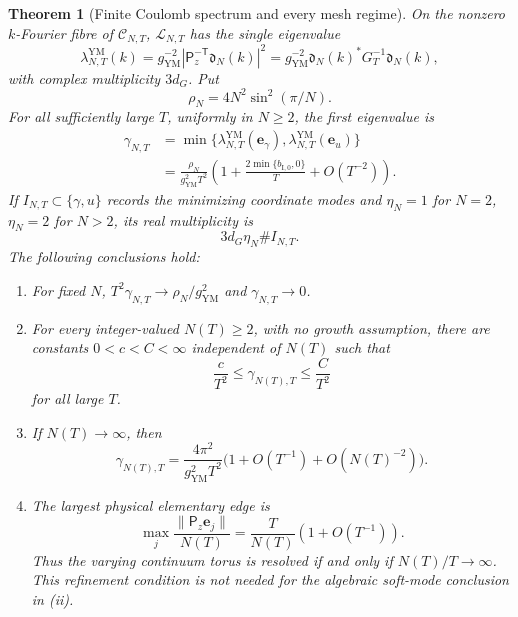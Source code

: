 \documentclass[11pt]{article}
\numberwithin{equation}{section}
\newtheorem{theorem}{Theorem}[section]
\theoremstyle{definition}
\theoremstyle{remark}
\begin{document}
\begin{theorem}[Finite Coulomb spectrum and every mesh regime]
\label{thm:finite-YM-gap}
On the nonzero $k$-Fourier fibre of $\mathscr C_{N,T}$,
$\mathcal L_{N,T}$ has the single eigenvalue
\begin{equation}\label{eq:finite-YM-mode}
 \lambda_{N,T}^{\mathrm{YM}}(k)
 =g_{\mathrm{YM}}^{-2}
 |\mathsf P_z^{-\mathsf T}\mathfrak d_N(k)|^2
 =g_{\mathrm{YM}}^{-2}\mathfrak d_N(k)^*G_T^{-1}
 \mathfrak d_N(k),
\end{equation}
with complex multiplicity $3d_G$.  Put
\begin{equation}\label{eq:finite-rho}
 \rho_N=4N^2\sin^2(\pi/N).
\end{equation}
For all sufficiently large $T$, uniformly in $N\ge2$, the first eigenvalue is
\begin{align}
 \gamma_{N,T}
 &=\min\{\lambda_{N,T}^{\mathrm{YM}}(\mathbf e_\gamma),
          \lambda_{N,T}^{\mathrm{YM}}(\mathbf e_u)\}
 \label{eq:finite-gap-exact}\\
 &=\frac{\rho_N}{g_{\mathrm{YM}}^2T^2}
 \left(1+\frac{2\min\{b_{\mathrm I,0},0\}}T+O(T^{-2})\right).
 \label{eq:finite-gap-expansion}
\end{align}
If $I_{N,T}\subset\{\gamma,u\}$ records the minimizing coordinate modes
and $\eta_N=1$ for $N=2$, $\eta_N=2$ for $N>2$, its real multiplicity is
\begin{equation}\label{eq:finite-gap-multiplicity}
 3d_G\eta_N\#I_{N,T}.
\end{equation}
The following conclusions hold:
\begin{enumerate}[label=(\roman*),leftmargin=2.3em]
\item For fixed $N$, $T^2\gamma_{N,T}\to\rho_N/g_{\mathrm{YM}}^2$ and
$\gamma_{N,T}\to0$.
\item For every integer-valued $N(T)\ge2$, with no growth assumption, there
are constants $0<c<C<\infty$ independent of $N(T)$ such that
\begin{equation}\label{eq:finite-arbitrary-mesh}
 \frac c{T^2}\le\gamma_{N(T),T}\le\frac C{T^2}
\end{equation}
for all large $T$.
\item If $N(T)\to\infty$, then
\begin{equation}\label{eq:finite-growing-mesh}
 \gamma_{N(T),T}=\frac{4\pi^2}{g_{\mathrm{YM}}^2T^2}
 \bigl(1+O(T^{-1})+O(N(T)^{-2})\bigr).
\end{equation}
\item The largest physical elementary edge is
\begin{equation}\label{eq:finite-mesh-size}
 \max_j\frac{\|\mathsf P_z\mathbf e_j\|}{N(T)}
 =\frac{T}{N(T)}(1+O(T^{-1})).
\end{equation}
Thus the varying continuum torus is resolved if and only if
$N(T)/T\to\infty$.  This refinement condition is not needed for the
algebraic soft-mode conclusion in (ii).
\end{enumerate}
\end{theorem}
\end{document}
